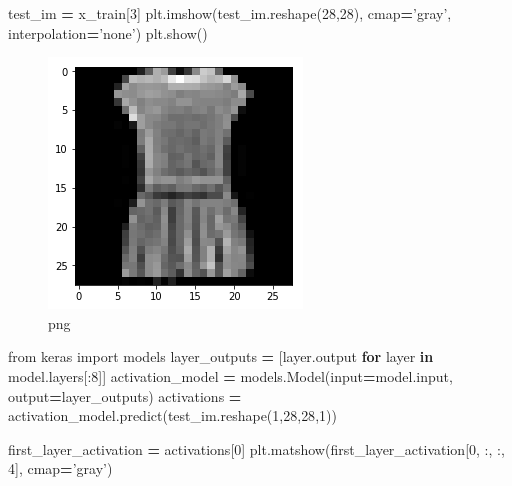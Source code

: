 \documentclass[]{book}
\newenvironment{Shaded}{\begin{snugshade}}{\end{snugshade}}
\newcommand{\KeywordTok}[1]{\textcolor[rgb]{0.13,0.29,0.53}{\textbf{#1}}}
\newcommand{\DecValTok}[1]{\textcolor[rgb]{0.00,0.00,0.81}{#1}}
\newcommand{\StringTok}[1]{\textcolor[rgb]{0.31,0.60,0.02}{#1}}
\newcommand{\ImportTok}[1]{#1}
\newcommand{\ControlFlowTok}[1]{\textcolor[rgb]{0.13,0.29,0.53}{\textbf{#1}}}
\newcommand{\OperatorTok}[1]{\textcolor[rgb]{0.81,0.36,0.00}{\textbf{#1}}}
\newcommand{\BuiltInTok}[1]{#1}
\newcommand{\NormalTok}[1]{#1}
\theoremstyle{definition}
\theoremstyle{definition}
\theoremstyle{definition}
\theoremstyle{remark}
\begin{document}
\begin{Shaded}
\begin{Highlighting}[]
\NormalTok{test_im }\OperatorTok{=}\NormalTok{ x_train[}\DecValTok{3}\NormalTok{]}
\NormalTok{plt.imshow(test_im.reshape(}\DecValTok{28}\NormalTok{,}\DecValTok{28}\NormalTok{), cmap}\OperatorTok{=}\StringTok{'gray'}\NormalTok{, interpolation}\OperatorTok{=}\StringTok{'none'}\NormalTok{)}
\NormalTok{plt.show()}
\end{Highlighting}
\end{Shaded}

\begin{figure}
\centering
\includegraphics{output_11_0.png}
\caption{png}
\end{figure}

\begin{Shaded}
\begin{Highlighting}[]
\ImportTok{from}\NormalTok{ keras }\ImportTok{import}\NormalTok{ models}
\NormalTok{layer_outputs }\OperatorTok{=}\NormalTok{ [layer.output }\ControlFlowTok{for}\NormalTok{ layer }\KeywordTok{in}\NormalTok{ model.layers[:}\DecValTok{8}\NormalTok{]]}
\NormalTok{activation_model }\OperatorTok{=}\NormalTok{ models.Model(}\BuiltInTok{input}\OperatorTok{=}\NormalTok{model.}\BuiltInTok{input}\NormalTok{, output}\OperatorTok{=}\NormalTok{layer_outputs)}
\NormalTok{activations }\OperatorTok{=}\NormalTok{ activation_model.predict(test_im.reshape(}\DecValTok{1}\NormalTok{,}\DecValTok{28}\NormalTok{,}\DecValTok{28}\NormalTok{,}\DecValTok{1}\NormalTok{))}

\NormalTok{first_layer_activation }\OperatorTok{=}\NormalTok{ activations[}\DecValTok{0}\NormalTok{]}
\NormalTok{plt.matshow(first_layer_activation[}\DecValTok{0}\NormalTok{, :, :, }\DecValTok{4}\NormalTok{], cmap}\OperatorTok{=}\StringTok{'gray'}\NormalTok{)}
\end{Highlighting}
\end{Shaded}
\end{document}
